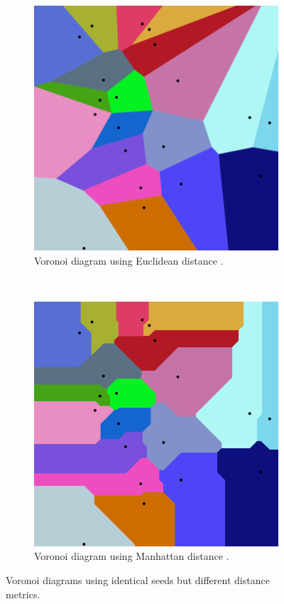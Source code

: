 \begin{figure}[H]
  \centering
  \begin{subfigure}[b]{0.4\textwidth}
    \includegraphics[width=\linewidth]{figure/voronoi_euclidean.png}
    \caption{Voronoi diagram using Euclidean distance \cite{voronoi_euclidean}.}
    \label{fig:voronoi_euclidean}
  \end{subfigure}
  ~
  \begin{subfigure}[b]{0.4\textwidth}
    \includegraphics[width=\linewidth]{figure/voronoi_manhattan.png}
    \caption{Voronoi diagram using Manhattan distance \cite{voronoi_manhattan}.}
    \label{fig:voronoi_manhattan}
  \end{subfigure}
  \caption{Voronoi diagrams using identical seeds but different distance metrics.}
  \label{fig:voronoi}
\end{figure}
